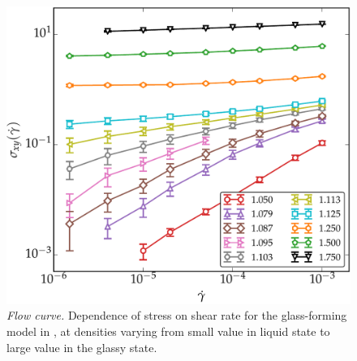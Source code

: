     \begin{figure}[hbt!]
	\includegraphics[width=14cm]{figs/fig_stress.pdf}
	\centering
	\caption[{\em Flow curve: dependence of stress on shear rate}]{{\em Flow curve.} Dependence of stress on shear rate for the glass-forming model in \cite{vaibhav2022finite,vaibhav2020response}, at densities varying from small value in liquid state to large value in the glassy state.\label{fig_stress}}
    \end{figure}
    
